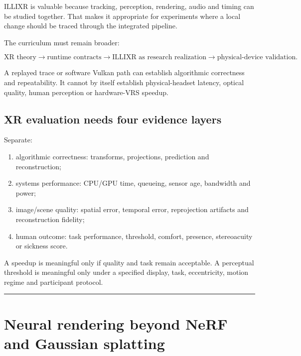 ILLIXR is valuable because tracking, perception, rendering, audio and timing can be studied together. That makes it appropriate for experiments where a local change should be traced through the integrated pipeline.

The curriculum must remain broader:

\[
\text{XR theory}\rightarrow
\text{runtime contracts}\rightarrow
\text{ILLIXR as research realization}\rightarrow
\text{physical-device validation}.
\]

A replayed trace or software Vulkan path can establish algorithmic correctness and repeatability. It cannot by itself establish physical-headset latency, optical quality, human perception or hardware-VRS speedup.

\subsection{XR evaluation needs four evidence layers}\label{xr-evaluation-needs-four-evidence-layers}

Separate:

\begin{enumerate}
\def\labelenumi{\arabic{enumi}.}
\tightlist
\item
  algorithmic correctness: transforms, projections, prediction and reconstruction;
\item
  systems performance: CPU/GPU time, queueing, sensor age, bandwidth and power;
\item
  image/scene quality: spatial error, temporal error, reprojection artifacts and reconstruction fidelity;
\item
  human outcome: task performance, threshold, comfort, presence, stereoacuity or sickness score.
\end{enumerate}

A speedup is meaningful only if quality and task remain acceptable. A perceptual threshold is meaningful only under a specified display, task, eccentricity, motion regime and participant protocol.

\begin{center}\rule{0.5\linewidth}{0.5pt}\end{center}

\section{Neural rendering beyond NeRF and Gaussian splatting}\label{neural-rendering-beyond-nerf-and-gaussian-splatting}

